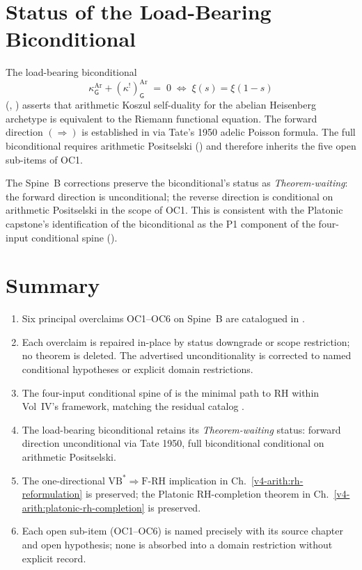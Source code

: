 \section{Status of the Load-Bearing Biconditional}
\label{v4-arith:w3-audit-B:load-bearing}

The load-bearing biconditional
\begin{equation*}
\kappa^{\mathrm{Ar}}_{\mathsf{G}}+(\kappa^{!})^{\mathrm{Ar}}_{\mathsf{G}}
\;=\;0\;\Longleftrightarrow\;\xi(s)=\xi(1-s)
\end{equation*}
(,
) asserts that arithmetic Koszul
self-duality for the abelian Heisenberg archetype is equivalent to
the Riemann functional equation. The forward direction
\((\Rightarrow)\) is established in
 via Tate's 1950
adelic Poisson formula. The full biconditional requires arithmetic
Positselski () and
therefore inherits the five open sub-items of OC1.

The Spine~B corrections preserve the biconditional's status as
\emph{Theorem-waiting}: the forward direction is unconditional; the
reverse direction is conditional on arithmetic Positselski in the
scope of OC1. This is consistent with the Platonic capstone's
identification of the biconditional as the P1 component of the
four-input conditional spine
().

\section{Summary}
\label{v4-arith:w3-audit-B:summary}

\begin{enumerate}
\item Six principal overclaims OC1--OC6 on Spine~B are catalogued
in .
\item Each overclaim is repaired in-place by status downgrade or
scope restriction; no theorem is deleted. The advertised
unconditionality is corrected to named conditional hypotheses or
explicit domain restrictions.
\item The four-input conditional spine of
 is the minimal
path to RH within Vol~IV's framework, matching the residual
catalog .
\item The load-bearing biconditional retains its
\emph{Theorem-waiting} status: forward direction unconditional via
Tate 1950, full biconditional conditional on arithmetic Positselski.
\item The one-directional
\(\mathrm{VB}^{*}\Rightarrow\mathrm{F}\text{-}\mathrm{RH}\)
implication in Ch.~\ref{v4-arith:rh-reformulation} is preserved;
the Platonic RH-completion theorem in
Ch.~\ref{v4-arith:platonic-rh-completion} is preserved.
\item Each open sub-item (OC1--OC6) is named precisely with its
source chapter and open hypothesis; none is absorbed into a domain
restriction without explicit record.
\end{enumerate}
